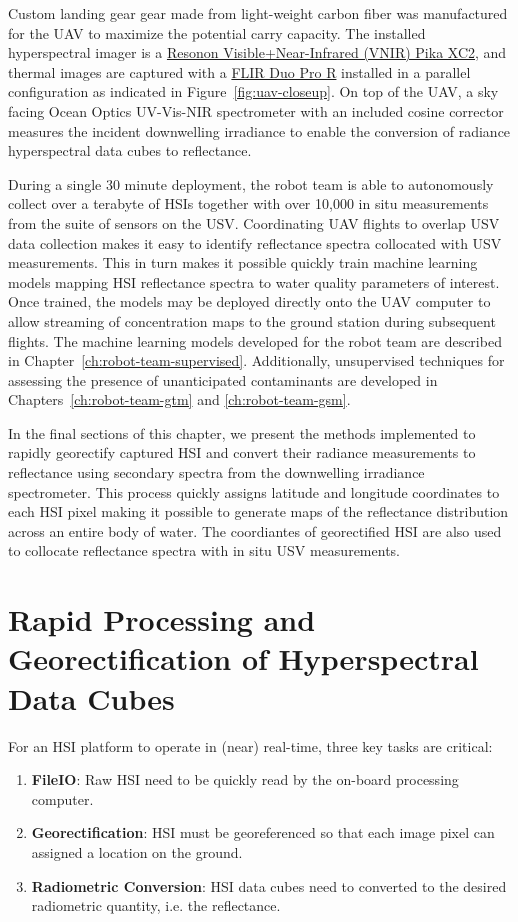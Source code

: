 Custom landing gear gear made from light-weight
carbon fiber was manufactured for the UAV to maximize the potential carry
capacity. The installed hyperspectral imager is a
\href{https://resonon.com/Pika-XC2}{Resonon Visible+Near-Infrared (VNIR) Pika
  XC2}, and thermal images are captured with
a \href{https://www.flir.com/products/duo-pro-r/}{FLIR Duo Pro R} installed
in a parallel configuration as indicated in Figure~\ref{fig:uav-closeup}. On top
of the UAV, a sky facing Ocean Optics UV-Vis-NIR spectrometer with an included
cosine corrector measures the incident downwelling irradiance to enable the
conversion of radiance hyperspectral data cubes to reflectance.

During a single 30 minute deployment, the robot team is able to autonomously
collect over a terabyte of HSIs together with over 10,000 in situ measurements
from the suite of sensors on the USV. Coordinating UAV flights to overlap USV
data collection makes it easy to identify reflectance spectra collocated with
USV measurements. This in turn makes it possible quickly train machine learning
models mapping HSI reflectance spectra to water quality parameters of interest.
Once trained, the models may be deployed directly onto the UAV computer to allow
streaming of concentration maps to the ground station during subsequent flights.
The machine learning models developed for the robot team are described in
Chapter~\ref{ch:robot-team-supervised}. Additionally, unsupervised techniques
for assessing the presence of unanticipated contaminants are developed in
Chapters~\ref{ch:robot-team-gtm} and
\ref{ch:robot-team-gsm}.

In the final sections of this chapter, we present the methods implemented to
rapidly georectify captured HSI and convert their radiance measurements to
reflectance using secondary spectra from the downwelling irradiance
spectrometer. This process quickly assigns latitude and longitude coordinates to
each HSI pixel making it possible to generate maps of the reflectance
distribution across an entire body of water. The coordiantes of georectified HSI
are also used to collocate reflectance spectra with in situ USV measurements.



\section{Rapid Processing and Georectification of Hyperspectral Data Cubes}

For an HSI platform to operate in (near) real-time, three key tasks are critical:
\begin{enumerate}
\item \textbf{FileIO}: Raw HSI need to be quickly read by the on-board processing computer.
\item \textbf{Georectification}: HSI must be georeferenced so that each image
  pixel can assigned a location on the ground.
\item \textbf{Radiometric Conversion}: HSI data cubes need to converted to the
  desired radiometric quantity, i.e. the reflectance.
\end{enumerate}

